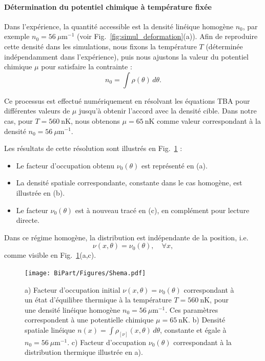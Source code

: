 \paragraph{Détermination du potentiel chimique à température fixée}

Dans l’expérience, la quantité accessible est la densité linéique homogène $n_0$, par exemple $n_0 = 56~\mu\mathrm{m}^{-1}$ (voir Fig.~\ref{fig:simul_deformation}(a)). Afin de reproduire cette densité dans les simulations, nous fixons la température $T$ (déterminée indépendamment dans l’expérience), puis nous ajustons la valeur du potentiel chimique $\mu$ pour satisfaire la contrainte :
\begin{equation}
n_0 = \int \rho(\theta)\, d\theta.
\end{equation}

Ce processus est effectué numériquement en résolvant les équations TBA pour différentes valeurs de $\mu$ jusqu’à obtenir l’accord avec la densité cible. Dans notre cas, pour $T = 560~\mathrm{nK}$, nous obtenons $\mu = 65~\mathrm{nK}$ comme valeur correspondant à la densité $n_0 = 56~\mu\mathrm{m}^{-1}$.

Les résultats de cette résolution sont illustrés en Fig.~\ref{fig:BiPart.insitut} :
\begin{itemize}[label = $\bullet$]
    \item Le facteur d’occupation obtenu $\nu_0(\theta)$ est représenté en (a).
    \item La densité spatiale correspondante, constante dans le cas homogène, est illustrée en (b).
    \item Le facteur $\nu_0(\theta)$ est à nouveau tracé en (c), en complément pour lecture directe.
\end{itemize}

Dans ce régime homogène, la distribution est indépendante de la position, i.e.
\begin{equation}
\nu(x, \theta) = \nu_0(\theta), \quad \forall x,
\end{equation}
comme visible en Fig.~\ref{fig:BiPart.insitut}(a,c).


\begin{figure}[!htb]
	\centering
	\texttt{[image: BiPart/Figures/Shema.pdf]}	
	\caption{a) Facteur d’occupation initial $\nu(x, \theta) = \nu_0(\theta)$ correspondant à un état d’équilibre thermique à la température $T = 560~\mathrm{nK}$, pour une densité linéique homogène $n_0 = 56~\mu\mathrm{m}^{-1}$. Ces paramètres correspondent à une potentielle chimique $\mu = 65~\mathrm{nK}$.
b) Densité spatiale linéique $n(x) = \int \rho_{[\nu]}(x, \theta)\, d\theta$, constante et égale à $n_0 = 56~\mu\mathrm{m}^{-1}$.
c) Facteur d’occupation $\nu_0(\theta)$ correspondant à la distribution thermique illustrée en a).}
	\label{fig:BiPart.insitut}
\end{figure}

